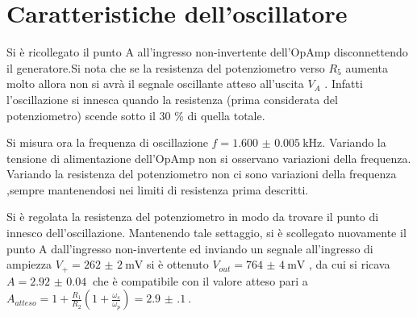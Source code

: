 \section{Caratteristiche dell'oscillatore}
Si è ricollegato il punto A all'ingresso non-invertente dell'OpAmp disconnettendo il generatore.Si nota che se la resistenza del potenziometro verso $R_5$ aumenta molto allora non si avrà il segnale oscillante atteso all'uscita $V_A$ . Infatti l'oscillazione si innesca quando la resistenza (prima considerata del potenziometro) scende sotto il 30 \% di quella totale. 

Si misura ora la frequenza di oscillazione $f= \SI{1.600(5)}{\kHz}$. Variando la tensione di alimentazione dell'OpAmp non si osservano variazioni della frequenza. Variando la resistenza del potenziometro non ci sono variazioni della frequenza ,sempre mantenendosi nei limiti di resistenza prima descritti.

Si è regolata la resistenza del potenziometro in modo da trovare il punto di innesco dell'oscillazione. Mantenendo tale settaggio, si è scollegato nuovamente il punto A dall'ingresso non-invertente ed inviando un segnale all'ingresso di ampiezza $V_+=\SI{262(2)}{\mV}$ si è ottenuto $V_{out}= \SI{764(4)}{\mV}$ , da cui si ricava $A=\SI{2.92(4)}{}$ che è compatibile con il valore atteso pari a $A_{atteso}= 1+\frac{R_1}{R_2}(1+\frac{\omega_s}{\omega_p})= \SI{2.9(1)}{}$.